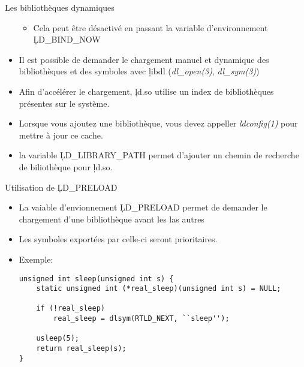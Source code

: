 \begin{frame}[fragile=singleslide]{  Les bibliothèques dynamiques}
\begin{itemize}
\begin{itemize}
    \item   Cela  peut   être   désactivé  en   passant  la   variable
      d'environnement \c{LD_BIND_NOW}
    \end{itemize} 
  \item Il est possible de  demander le chargement manuel et dynamique
    des    bibliothèques    et    des    symboles    avec    \c{libdl}
    (\emph{dl_open(3)}, \emph{dl_sym(3)})
  \item Afin d'accélérer le  chargement, \c{ld.so} utilise un index de
    bibliothèques présentes  sur le  système.
  \item  Lorsque vous  ajoutez une  bibliothèque, vous  devez appeller
    \emph{ldconfig(1)} pour mettre à jour ce cache.
  \item la variable \c{LD_LIBRARY_PATH}  permet d'ajouter un chemin de
    recherche de biliothèque pour \c{ld.so}.
  \end{itemize} 
\end{frame} 

\begin{frame}[fragile=singleslide]{Utilisation de \c{LD_PRELOAD}}
  \begin{itemize} 
  \item La vaiable d'envionnement \c{LD_PRELOAD} permet de demander le
    chargement d'une bibliothèque avant  les las autres
  \item Les symboles exportées par celle-ci seront prioritaires.
  \item Exemple:
    \begin{lstlisting} 
unsigned int sleep(unsigned int s) {
    static unsigned int (*real_sleep)(unsigned int s) = NULL;

    if (!real_sleep)
        real_sleep = dlsym(RTLD_NEXT, ``sleep'');

    usleep(5);
    return real_sleep(s);
}
    \end{lstlisting}
  \end{itemize} 
\end{frame} 

